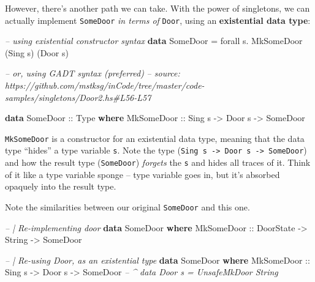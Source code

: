 \documentclass[]{article}
\newenvironment{Shaded}{}{}
\newcommand{\CommentTok}[1]{\textcolor[rgb]{0.38,0.63,0.69}{\textit{#1}}}
\newcommand{\DataTypeTok}[1]{\textcolor[rgb]{0.56,0.13,0.00}{#1}}
\newcommand{\FunctionTok}[1]{\textcolor[rgb]{0.02,0.16,0.49}{#1}}
\newcommand{\KeywordTok}[1]{\textcolor[rgb]{0.00,0.44,0.13}{\textbf{#1}}}
\newcommand{\NormalTok}[1]{#1}
\newcommand{\OtherTok}[1]{\textcolor[rgb]{0.00,0.44,0.13}{#1}}
\begin{document}
However, there's another path we can take. With the power of singletons, we can
actually implement \texttt{SomeDoor} \emph{in terms of} \texttt{Door}, using an
\textbf{existential data type}:

\begin{Shaded}
\begin{Highlighting}[]
\CommentTok{-- using existential constructor syntax}
\KeywordTok{data} \DataTypeTok{SomeDoor} \FunctionTok{=}\NormalTok{ forall s}\FunctionTok{.} \DataTypeTok{MkSomeDoor}\NormalTok{ (}\DataTypeTok{Sing}\NormalTok{ s) (}\DataTypeTok{Door}\NormalTok{ s)}

\CommentTok{-- or, using GADT syntax (preferred)}
\CommentTok{-- source: https://github.com/mstksg/inCode/tree/master/code-samples/singletons/Door2.hs#L56-L57}

\KeywordTok{data} \DataTypeTok{SomeDoor}\OtherTok{ ::} \DataTypeTok{Type} \KeywordTok{where}
    \DataTypeTok{MkSomeDoor}\OtherTok{ ::} \DataTypeTok{Sing}\NormalTok{ s }\OtherTok{->} \DataTypeTok{Door}\NormalTok{ s }\OtherTok{->} \DataTypeTok{SomeDoor}
\end{Highlighting}
\end{Shaded}

\texttt{MkSomeDoor} is a constructor for an existential data type, meaning that
the data type ``hides'' a type variable \texttt{s}. Note the type
(\texttt{Sing\ s\ -\textgreater{}\ Door\ s\ -\textgreater{}\ SomeDoor}) and how
the result type (\texttt{SomeDoor}) \emph{forgets} the \texttt{s} and hides all
traces of it. Think of it like a type variable sponge -- type variable goes in,
but it's absorbed opaquely into the result type.

Note the similarities between our original \texttt{SomeDoor} and this one.

\begin{Shaded}
\begin{Highlighting}[]
\CommentTok{-- | Re-implementing door}
\KeywordTok{data} \DataTypeTok{SomeDoor} \KeywordTok{where}
    \DataTypeTok{MkSomeDoor}\OtherTok{ ::} \DataTypeTok{DoorState} \OtherTok{->} \DataTypeTok{String} \OtherTok{->} \DataTypeTok{SomeDoor}

\CommentTok{-- | Re-using Door, as an existential type}
\KeywordTok{data} \DataTypeTok{SomeDoor} \KeywordTok{where}
    \DataTypeTok{MkSomeDoor}\OtherTok{  ::} \DataTypeTok{Sing}\NormalTok{ s  }\OtherTok{->} \DataTypeTok{Door}\NormalTok{ s }\OtherTok{->} \DataTypeTok{SomeDoor}
                            \CommentTok{-- ^ data Door s = UnsafeMkDoor String}
\end{Highlighting}
\end{Shaded}
\end{document}
